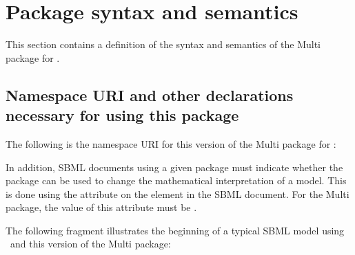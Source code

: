 
\section{Package syntax and semantics}
\label{def:Package_syntax_semantics}

 This section contains a definition of the syntax and semantics of the Multi package for \SbmlLevelThreeCore.

\subsection{Namespace URI and other declarations necessary for using this package}
\label{def:Namespace_URI}

The following is the namespace URI for this version of the Multi package for \SbmlLevelThreeCore:
\begin{center}
\end{center}

In addition, SBML documents using a given package must indicate whether the package can be used to change the mathematical interpretation of a model. This is done using the attribute  on the  element in the SBML document. For the Multi package, the value of this attribute must be .

The following fragment illustrates the beginning of a typical SBML model using \SbmlLevelThreeCore\ and this version of the Multi package:

